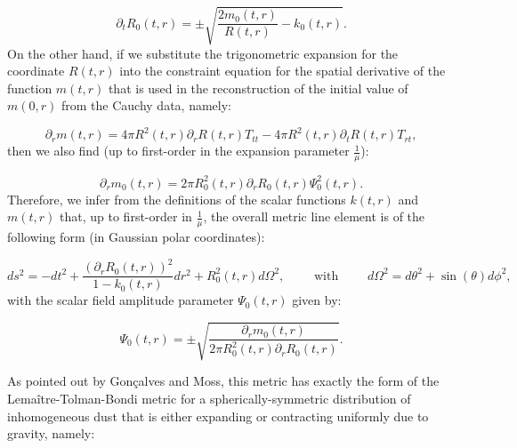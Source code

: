 \documentclass{article}
\begin{document}
\begin{equation}
\partial_t R_0 \left( t, r \right) = \pm \sqrt{\frac{2 m_0 \left( t, r \right)}{R \left( t, r \right)} - k_0 \left( t, r \right)}.
\end{equation}
On the other hand, if we substitute the trigonometric expansion for the coordinate ${R \left( t, r \right)}$ into the constraint equation for the spatial derivative of the function ${m \left( t, r \right)}$ that is used in the reconstruction of the initial value of ${m \left( 0, r \right)}$ from the Cauchy data, namely:

\begin{equation}
\partial_r m \left( t, r \right) = 4 \pi R^2 \left( t, r \right) \partial_r R \left( t, r \right) T_{t t} - 4 \pi R^2 \left( t, r \right) \partial_t R \left( t, r \right) T_{r t},
\end{equation}
then we also find (up to first-order in the expansion parameter ${\frac{1}{\mu}}$):

\begin{equation}
\partial_r m_0 \left( t, r \right) = 2 \pi R_{0}^{2} \left( t, r \right) \partial_r R_0 \left( t, r \right) \Psi_{0}^{2} \left( t, r \right).
\end{equation}
Therefore, we infer from the definitions of the scalar functions ${k \left( t, r \right)}$ and ${m \left( t, r \right)}$ that, up to first-order in ${\frac{1}{\mu}}$, the overall metric line element is of the following form (in Gaussian polar coordinates):

\begin{equation}
d s^2 = - dt^2 + \frac{\left( \partial_r R_0 \left( t, r \right) \right)^2}{1 - k_0 \left( t, r \right)} dr^2 + R_{0}^{2} \left( t, r \right) d \Omega^2, \qquad \text{ with } \qquad d \Omega^2 = d \theta^2 + \sin \left( \theta \right) d \phi^2,
\end{equation}
with the scalar field amplitude parameter ${\Psi_0 \left( t, r \right)}$ given by:

\begin{equation}
\Psi_0 \left( t, r \right) = \pm \sqrt{ \frac{\partial_r m_0 \left( t, r \right)}{2 \pi R_{0}^{2} \left( t, r \right) \partial_r R_0 \left( t, r \right)}}.
\end{equation}

As pointed out by Gon\c{c}alves and Moss\cite{goncalves}, this metric has exactly the form of the Lema\^itre-Tolman-Bondi metric\cite{lemaitre}\cite{tolman}\cite{bondi} for a spherically-symmetric distribution of inhomogeneous dust that is either expanding or contracting uniformly due to gravity, namely:
\end{document}
